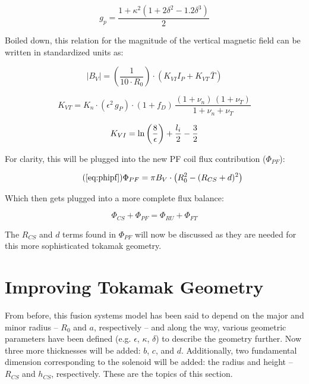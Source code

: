 \begin{equation}
  g_p = \frac{1 + \kappa^2 ( 1 + 2 \delta^2 - 1.2\delta^3 )}{2} 
\end{equation}

Boiled down, this relation for the magnitude of the vertical magnetic field can be written in standardized units as:

\begin{equation}
	|B_V| = \left( \frac{ 1 }{ 10 \cdot R_0} \right) \cdot \left( K_{VI} I_P +  K_{VT\,} \overline{T}  \right)
\end{equation}

\begin{equation}
	K_{VT} = K_{n} \cdot ( \epsilon ^ 2 \, g_P ) \cdot ( 1 + f_D ) \, \frac{ (1 + \nu_n) \, (1 + \nu_T) }{1 + \nu_n + \nu_T }
\end{equation}

\begin{equation}
	K_{VI} = \textnormal{ln} \left(\frac{8}{\epsilon}\right) + \frac{l_i}{2} - \frac{3}{2}
\end{equation}

For clarity, this will be plugged into the new PF coil flux contribution ($\Phi_{PF}$):

\begin{equation}
	\tag{\ref{eq:phipf}}
	\Phi_{PF} = \pi B_V \cdot \left( R_0^2 - ( R_{CS} + d ) ^ 2 \right)
\end{equation}

Which then gets plugged into a more complete flux balance:

\begin{equation}
	\Phi_{CS} + \Phi_{PF} = \Phi_{RU} + \Phi_{FT}
\end{equation}

The $R_{CS}$ and $d$ terms found in $\Phi_{PF}$ will now be discussed as they are needed for this more sophisticated tokamak geometry.

\section{Improving Tokamak Geometry}

From before, this fusion systems model has been said to depend on the major and minor radius -- $R_0$ and $a$, respectively -- and along the way, various geometric parameters have been defined (e.g. $\epsilon$, $\kappa$, $\delta$) to describe the geometry further. Now three more thicknesses will be added: $b$, $c$, and $d$. Additionally, two fundamental dimension corresponding to the solenoid will be added: the radius and height -- $R_{CS}$ and $h_{CS}$, respectively. These are the topics of this section.

